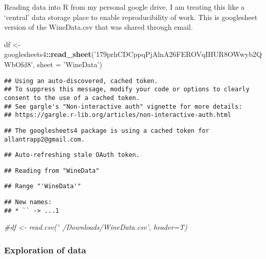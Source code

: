 \documentclass[
]{article}
\newenvironment{Shaded}{\begin{snugshade}}{\end{snugshade}}
\newcommand{\CommentTok}[1]{\textcolor[rgb]{0.56,0.35,0.01}{\textit{#1}}}
\newcommand{\DataTypeTok}[1]{\textcolor[rgb]{0.13,0.29,0.53}{#1}}
\newcommand{\KeywordTok}[1]{\textcolor[rgb]{0.13,0.29,0.53}{\textbf{#1}}}
\newcommand{\NormalTok}[1]{#1}
\newcommand{\OperatorTok}[1]{\textcolor[rgb]{0.81,0.36,0.00}{\textbf{#1}}}
\newcommand{\StringTok}[1]{\textcolor[rgb]{0.31,0.60,0.02}{#1}}
\begin{document}
Reading data into R from my personal google drive. I am treating this
like a `central' data storage place to enable reproducibility of work.
This is googlesheet version of the WineData.csv that was shared through
email.

\begin{Shaded}
\begin{Highlighting}[]
\NormalTok{df <-}\StringTok{ }\NormalTok{googlesheets4}\OperatorTok{::}\KeywordTok{read_sheet}\NormalTok{(}\StringTok{'179prhCDCppqPjAlnA26FEROVqIHUR8OWwyb2QWbOfd8'}\NormalTok{,}
                        \DataTypeTok{sheet =} \StringTok{'WineData'}\NormalTok{)}
\end{Highlighting}
\end{Shaded}

\begin{verbatim}
## Using an auto-discovered, cached token.
## To suppress this message, modify your code or options to clearly consent to the use of a cached token.
## See gargle's "Non-interactive auth" vignette for more details:
## https://gargle.r-lib.org/articles/non-interactive-auth.html
\end{verbatim}

\begin{verbatim}
## The googlesheets4 package is using a cached token for allantrapp2@gmail.com.
\end{verbatim}

\begin{verbatim}
## Auto-refreshing stale OAuth token.
\end{verbatim}

\begin{verbatim}
## Reading from "WineData"
\end{verbatim}

\begin{verbatim}
## Range "'WineData'"
\end{verbatim}

\begin{verbatim}
## New names:
## * `` -> ...1
\end{verbatim}

\begin{Shaded}
\begin{Highlighting}[]
\CommentTok{#df <- read.csv('~/Downloads/WineData.csv', header=T)}
\end{Highlighting}
\end{Shaded}

\hypertarget{exploration-of-data}{%
\subsubsection{Exploration of data}\label{exploration-of-data}}
\end{document}
